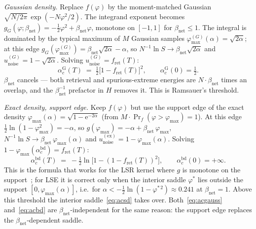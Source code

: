\documentclass[11pt]{article}
\newcommand{\e}{{\mathrm{e}}}
\newcommand{\Bnet}{\beta_{\mathrm{net}}}
\newcommand{\fret}{f_{\mathrm{ret}}}
\newcommand{\acGauss}{\alpha_c^{\mathrm{G}}}
\newcommand{\acBd}{\alpha_c^{\mathrm{bd}}}
\begin{document}
\textit{Gaussian density.}
Replace $f(\varphi)$ by the moment-matched Gaussian
$\sqrt{N/2\pi}\,\exp(-N\varphi^2/2)$.  The integrand exponent becomes
$g_G(\varphi; \Bnet) = -\tfrac12 \varphi^2 + \Bnet\varphi$, monotone on
$[-1,1]$ for $\Bnet \le 1$.  The integral is dominated by the typical
maximum of $M$ Gaussian samples
$\varphi_{\max}^{(G)}(\alpha) = \sqrt{2\alpha}$; at this edge
$g_G(\varphi_{\max}^{(G)}) = \Bnet\sqrt{2\alpha} - \alpha$, so
$N^{-1}\ln S \to \Bnet\sqrt{2\alpha}$ and
$u_{\mathrm{noise}}^{(G)} = 1 - \sqrt{2\alpha}$.  Solving
$u_{\mathrm{noise}}^{(G)} = \fret(T)$:
\begin{equation}
\acGauss(T) \;=\; \tfrac12 \bigl[1 - \fret(T)\bigr]^2,
\qquad \acGauss(0) = \tfrac12.
\label{eq:acgauss}
\end{equation}
$\Bnet$ cancels — both retrieval and spurious-extreme energies are
$N\!\cdot\!\Bnet$ times an overlap, and the $\Bnet^{-1}$ prefactor in
$H$ removes it.  This is Ramsauer's threshold.

\textit{Exact density, support edge.}
Keep $f(\varphi)$ but use the support edge of the exact density
$\varphi_{\max}(\alpha) = \sqrt{1 - \e^{-2\alpha}}$ (from
$M \cdot \Pr_f(\varphi > \varphi_{\max}) = 1$).  At this edge
$\tfrac12 \ln(1 - \varphi_{\max}^2) = -\alpha$, so
$g(\varphi_{\max}) = -\alpha + \Bnet\,\varphi_{\max}$,
$N^{-1}\ln S \to \Bnet\,\varphi_{\max}(\alpha)$ and
$u_{\mathrm{noise}}^{(\mathrm{ex})} = 1 - \varphi_{\max}(\alpha)$.
Solving $1 - \varphi_{\max}(\acBd) = \fret(T)$:
\begin{equation}
\acBd(T) \;=\; -\tfrac12 \ln\!\bigl[1 - (1 - \fret(T))^2\bigr],
\qquad \acBd(0) = +\infty.
\label{eq:acbd}
\end{equation}
This is the formula that works for the LSR kernel where $g$ is monotone
on the support~\citep{petrova2026metastable}; for LSE it is correct only
when the interior saddle $\varphi^{*}$ lies outside the support
$[0, \varphi_{\max}(\alpha)]$, i.e.\ for
$\alpha < -\tfrac12 \ln(1 - \varphi^{*\,2}) \approx 0.241$ at
$\Bnet = 1$.  Above this threshold the interior saddle~\eqref{eq:acsd}
takes over.  Both~\eqref{eq:acgauss} and~\eqref{eq:acbd} are
$\Bnet$-independent for the same reason: the support edge replaces the
$\Bnet$-dependent saddle.
\end{document}
